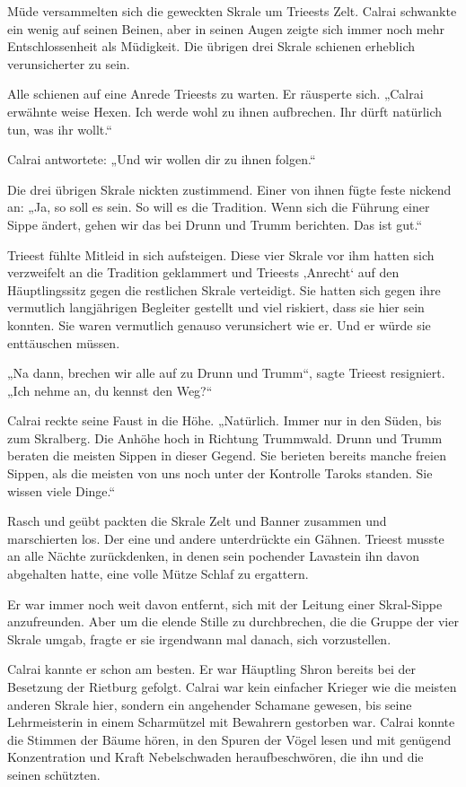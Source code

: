 \trennzeichen



Müde versammelten sich die geweckten Skrale um Trieests Zelt. Calrai schwankte ein wenig auf seinen Beinen, aber in seinen Augen zeigte sich immer noch mehr Entschlossenheit als Müdigkeit. Die übrigen drei Skrale schienen erheblich verunsicherter zu sein.

Alle schienen auf eine Anrede Trieests zu warten. Er räusperte sich. „Calrai erwähnte weise Hexen. Ich werde wohl zu ihnen aufbrechen. Ihr dürft natürlich tun, was ihr wollt.“

Calrai antwortete: „Und wir wollen dir zu ihnen folgen.“

Die drei übrigen Skrale nickten zustimmend. Einer von ihnen fügte feste nickend an: „Ja, so soll es sein. So will es die Tradition. Wenn sich die Führung einer Sippe ändert, gehen wir das bei Drunn und Trumm berichten. Das ist gut.“

Trieest fühlte Mitleid in sich aufsteigen. Diese vier Skrale vor ihm hatten sich verzweifelt an die Tradition geklammert und Trieests ‚Anrecht‘ auf den Häuptlingssitz gegen die restlichen Skrale verteidigt. Sie hatten sich gegen ihre vermutlich langjährigen Begleiter gestellt und viel riskiert, dass sie hier sein konnten. Sie waren vermutlich genauso verunsichert wie er. Und er würde sie enttäuschen müssen.

„Na dann, brechen wir alle auf zu Drunn und Trumm“, sagte Trieest resigniert. „Ich nehme an, du kennst den Weg?“

Calrai reckte seine Faust in die Höhe. „Natürlich. Immer nur in den Süden, bis zum Skralberg. Die Anhöhe hoch in Richtung Trummwald. Drunn und Trumm beraten die meisten Sippen in dieser Gegend. Sie berieten bereits manche freien Sippen, als die meisten von uns noch unter der Kontrolle Taroks standen. Sie wissen viele Dinge.“

Rasch und geübt packten die Skrale Zelt und Banner zusammen und marschierten los. Der eine und andere unterdrückte ein Gähnen. Trieest musste an alle Nächte zurückdenken, in denen sein pochender Lavastein ihn davon abgehalten hatte, eine volle Mütze Schlaf zu ergattern.

Er war immer noch weit davon entfernt, sich mit der Leitung einer Skral-Sippe anzufreunden. Aber um die elende Stille zu durchbrechen, die die Gruppe der vier Skrale umgab, fragte er sie irgendwann mal danach, sich vorzustellen.

Calrai kannte er schon am besten. Er war Häuptling Shron bereits bei der Besetzung der Rietburg gefolgt. Calrai war kein einfacher Krieger wie die meisten anderen Skrale hier, sondern ein angehender Schamane gewesen, bis seine Lehrmeisterin in einem Scharmützel mit Bewahrern gestorben war. Calrai konnte die Stimmen der Bäume hören, in den Spuren der Vögel lesen und mit genügend Konzentration und Kraft Nebelschwaden heraufbeschwören, die ihn und die seinen schützten.

